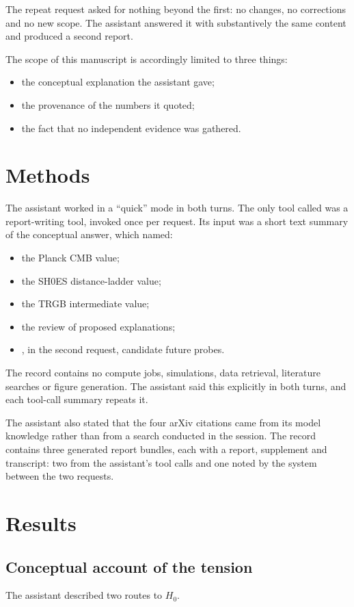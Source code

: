\documentclass[11pt,a4paper]{article}
\begin{document}
The repeat request asked for nothing beyond the first: no changes, no corrections and no new scope. The assistant answered it with substantively the same content and produced a second report.

The scope of this manuscript is accordingly limited to three things:
\begin{itemize}
\item the conceptual explanation the assistant gave;
\item the provenance of the numbers it quoted;
\item the fact that no independent evidence was gathered.
\end{itemize}

\section{Methods}
The assistant worked in a ``quick'' mode in both turns. The only tool called was a report-writing tool, invoked once per request. Its input was a short text summary of the conceptual answer, which named:
\begin{itemize}
\item the Planck CMB value;
\item the SH0ES distance-ladder value;
\item the TRGB intermediate value;
\item the review of proposed explanations;
\item, in the second request, candidate future probes.
\end{itemize}

The record contains no compute jobs, simulations, data retrieval, literature searches or figure generation. The assistant said this explicitly in both turns, and each tool-call summary repeats it.

The assistant also stated that the four arXiv citations came from its model knowledge rather than from a search conducted in the session. The record contains three generated report bundles, each with a report, supplement and transcript: two from the assistant's tool calls and one noted by the system between the two requests.

\section{Results}

\subsection{Conceptual account of the tension}
The assistant described two routes to $H_0$.
\end{document}
